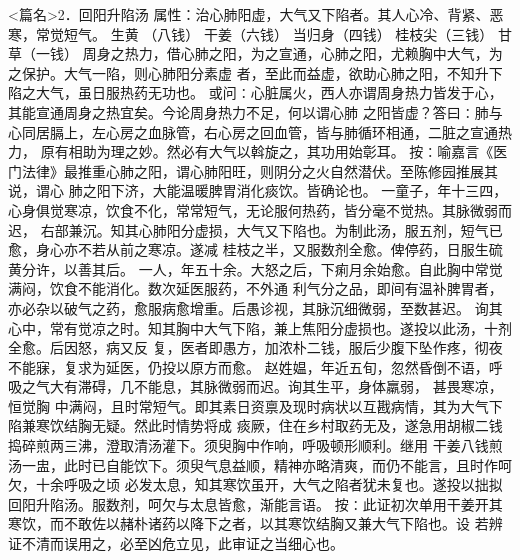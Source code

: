 \documentclass[a4paper,12pt,UTF8,twoside]{ctexbook}
\begin{document}
<篇名>2．回阳升陷汤
属性：治心肺阳虚，大气又下陷者。其人心冷、背紧、恶寒，常觉短气。 
生黄 （八钱） 干姜（六钱） 当归身（四钱） 桂枝尖（三钱） 甘草（一钱） 
周身之热力，借心肺之阳，为之宣通，心肺之阳，尤赖胸中大气，为之保护。大气一陷，则心肺阳分素虚 
者，至此而益虚，欲助心肺之阳，不知升下陷之大气，虽日服热药无功也。 
或问∶心脏属火，西人亦谓周身热力皆发于心，其能宣通周身之热宜矣。今论周身热力不足，何以谓心肺 
之阳皆虚？答曰∶肺与心同居膈上，左心房之血脉管，右心房之回血管，皆与肺循环相通，二脏之宣通热力， 
原有相助为理之妙。然必有大气以斡旋之，其功用始彰耳。 
按∶喻嘉言《医门法律》最推重心肺之阳，谓心肺阳旺，则阴分之火自然潜伏。至陈修园推展其说，谓心 
肺之阳下济，大能温暖脾胃消化痰饮。皆确论也。 
一童子，年十三四，心身俱觉寒凉，饮食不化，常常短气，无论服何热药，皆分毫不觉热。其脉微弱而迟， 
右部兼沉。知其心肺阳分虚损，大气又下陷也。为制此汤，服五剂，短气已愈，身心亦不若从前之寒凉。遂减 
桂枝之半，又服数剂全愈。俾停药，日服生硫黄分许，以善其后。 
一人，年五十余。大怒之后，下痢月余始愈。自此胸中常觉满闷，饮食不能消化。数次延医服药，不外通 
利气分之品，即间有温补脾胃者，亦必杂以破气之药，愈服病愈增重。后愚诊视，其脉沉细微弱，至数甚迟。 
询其心中，常有觉凉之时。知其胸中大气下陷，兼上焦阳分虚损也。遂投以此汤，十剂全愈。后因怒，病又反 
复，医者即愚方，加浓朴二钱，服后少腹下坠作疼，彻夜不能寐，复求为延医，仍投以原方而愈。 
赵姓媪，年近五旬，忽然昏倒不语，呼吸之气大有滞碍，几不能息，其脉微弱而迟。询其生平，身体羸弱， 
甚畏寒凉，恒觉胸 
中满闷，且时常短气。即其素日资禀及现时病状以互戡病情，其为大气下陷兼寒饮结胸无疑。然此时情势将成 
痰厥，住在乡村取药无及，遂急用胡椒二钱捣碎煎两三沸，澄取清汤灌下。须臾胸中作响，呼吸顿形顺利。继用 
干姜八钱煎汤一盅，此时已自能饮下。须臾气息益顺，精神亦略清爽，而仍不能言，且时作呵欠，十余呼吸之顷 
必发太息，知其寒饮虽开，大气之陷者犹未复也。遂投以拙拟回阳升陷汤。服数剂，呵欠与太息皆愈，渐能言语。 
按∶此证初次单用干姜开其寒饮，而不敢佐以赭朴诸药以降下之者，以其寒饮结胸又兼大气下陷也。设 
若辨证不清而误用之，必至凶危立见，此审证之当细心也。 
\end{document}

